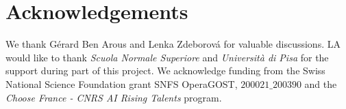 \section*{Acknowledgements}

We thank G\'erard Ben Arous and Lenka Zdeborov\'a for valuable discussions. LA would like to thank \emph{Scuola Normale Superiore} and \emph{Università di Pisa} for the support during part of this project. We acknowledge funding from the Swiss National Science Foundation grant SNFS OperaGOST, $200021\_200390$ and the \textit{Choose France - CNRS AI Rising Talents} program.
